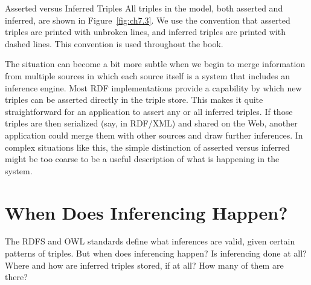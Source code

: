 \begin{example}{Asserted versus Inferred Triples}
All triples in the model, both asserted and inferred, are shown in
Figure~\ref{fig:ch7.3}. We use the convention that asserted triples are printed with
unbroken lines, and inferred triples are printed with dashed lines. This
convention is used throughout the book.
\end{example}

The situation can become a bit more subtle when we begin to merge
information from multiple sources in which each source itself is a
system that includes an inference engine. Most RDF implementations
provide a capability by which new triples can be asserted directly in
the triple store. This makes it quite straightforward for an application
to assert any or all inferred triples. If those triples are then
serialized (say, in RDF/XML) and shared on the Web, another application
could merge them with other sources and draw further inferences. In
complex situations like this, the simple distinction of asserted versus
inferred might be too coarse to be a useful description of what is
happening in the system.

\section{When Does Inferencing Happen?}

The RDFS and OWL standards define what inferences are valid, given
certain patterns of triples. But when does inferencing happen? Is
inferencing done at all? Where and how are inferred triples stored, if
at all? How many of them are there?


